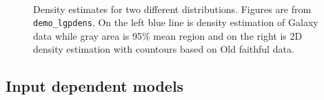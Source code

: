 \documentclass[twoside,11pt]{article}
\newcommand{\code}[1]{{\normalfont\texttt{#1}}}
\begin{document}
\begin{figure}[]
  \begin{center}
    ~
    \caption[]{Density estimates for two different distributions. Figures are from \code{demo\_lgpdens}. On the left blue line is density estimation of Galaxy data while gray area is 95\% mean region and on the right is 2D density estimation with countours based on Old faithful data.}\label{fig_demo_lgpdens}
  \end{center}
\end{figure}

%


%
%

\subsection{Input dependent models}
\end{document}

